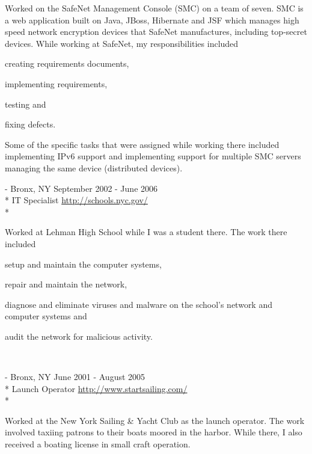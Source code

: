 \documentclass[a4paper,margin,line]{resume}
\newcommand{\rurl}[1]{\hfill {\footnotesize \url{#1}}}
\newcommand{\rdate}[1]{\hfill {\small #1}}
\renewcommand{\employer}[5]{\item[#1] - #2 \rdate{#3} \\* #4 \rurl{#5} \\*}
\begin{document}
\begin{resume}
\begin{asparadesc}
		\small
		Worked on the SafeNet Management Console (SMC) on a team of seven. SMC is
		a web application built on Java, JBoss, Hibernate and JSF which manages high
		speed network encryption devices that SafeNet manufactures, including
		top-secret devices. While working at SafeNet, my responsibilities included
		\begin{inparaenum} \item creating requirements documents, \item implementing
		requirements, \item testing and \item fixing defects. \end{inparaenum} Some
		of the specific tasks that were assigned while working there included
		implementing IPv6 support and implementing support for multiple SMC servers
		managing the same device (distributed devices).
		\normalsize
		\\
		\employer{New York City Department of Education}{Bronx, NY}{September 2002 -
		June 2006}{IT Specialist}{http://schools.nyc.gov/}

		\small
		Worked at Lehman High School while I was a student there. The work there
		included \begin{inparaenum} \item setup and maintain the computer systems,
		\item repair and maintain the network, \item diagnose and eliminate viruses
		and malware on the school's network and computer systems and \item audit the
		network for malicious activity. \end{inparaenum}
		\normalsize
		\\
		\employer{New York Sailing \& Yacht Club}{Bronx, NY}{June 2001 - August 2005}{Launch
		Operator}{http://www.startsailing.com/}
		
		\small
		Worked at the New York Sailing \& Yacht Club as the launch operator. The
		work involved taxiing patrons to their boats moored in the harbor. While
		there, I also received a boating license in small craft operation.
		\normalsize
	\end{asparadesc}


\end{resume}
\end{document}
